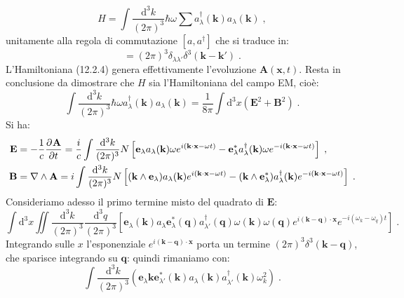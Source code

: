 \documentclass[12pt,a4paper]{report}
\theoremstyle{definition}
\newcommand{\pdev}[3][]{\frac{\partial^{#1} #2}{\partial #3^{#1}}}
\numberwithin{equation}{section}
\newcommand{\diff}[1][]{\mathrm{d}#1}
\newcommand{\adj}[1]{#1^{\dagger}}
\begin{document}
\begin{equation}
H=\int \frac{\diff^3{k}}{(2\pi)^3}\hbar\omega\sum \adj{a_{\lambda}}(\mathbf{k})a_{\lambda}(\mathbf{k})\;,
\end{equation}
unitamente alla regola di commutazione $[a,\adj{a}]$ che si traduce in:
\begin{equation}
[a_{\lambda}(\mathbf{k}),\adj{a}_{\lambda'}(\mathbf{k}')]=(2\pi)^3\delta_{\lambda\lambda'}\delta^3(\mathbf{k}-\mathbf{k}')\;.
\end{equation}
L'Hamiltoniana (12.2.4) genera effettivamente l'evoluzione $\mathbf{A}(\mathbf{x},t)$. Resta in conclusione da dimostrare che $H$ sia l'Hamiltoniana del campo EM, cioè:
\begin{equation}
\int \frac{\diff^3{k}}{(2\pi)^3}\hbar\omega\adj{a_{\lambda}}(\mathbf{k})a_{\lambda}(\mathbf{k})=\frac{1}{8\pi}\int\diff^3{x}(\mathbf{E}^2+\mathbf{B}^2)\;.
\end{equation}
Si ha:
\begin{align}
\mathbf{E} &= -\frac{1}{c}\pdev{\mathbf{A}}{t} = \frac{i}{c}\int\frac{\diff^3{k}}{(2\pi)^3}N\left[
\mathbf{e}_{\lambda}a_{\lambda}(\mathbf{k})\omega e^{i(\mathbf{k}\cdot\mathbf{x}-\omega t)}-
\mathbf{e}_{\lambda}^* \adj{a_{\lambda}}(\mathbf{k})\omega e^{-i(\mathbf{k}\cdot\mathbf{x}-\omega t)}\right] \notag\;, \\
\mathbf{B} &= \nabla\wedge\mathbf{A}=i\int\frac{\diff^3{k}}{(2\pi)^3}N\left[(\mathbf{k}\wedge\mathbf{e}_{\lambda})a_{\lambda}(\mathbf{k})e^{i(\mathbf{k}\cdot\mathbf{x}-\omega t)}-
(\mathbf{k}\wedge\mathbf{e}_{\lambda}^*)\adj{a_{\lambda}}(\mathbf{k})e^{-i(\mathbf{k}\cdot\mathbf{x}-\omega t)}\right]\;.
\end{align}
Consideriamo adesso il primo termine misto del quadrato di $\mathbf{E}$:
\begin{equation}
\int\diff^3{x}\iint \frac{\diff^3{k}}{(2\pi)^3}\frac{\diff^3{q}}{(2\pi)^3}\left[
\mathbf{e}_{\lambda}(\mathbf{k})a_{\lambda}\mathbf{e}_{\lambda}^*(\mathbf{q})\adj{a_{\lambda'}}(\mathbf{q})\omega(\mathbf{k})\omega(\mathbf{q})e^{i(\mathbf{k}-\mathbf{q})\cdot\mathbf{x}}e^{-i(\omega_k-\omega_q)t}\right]\;.
\end{equation}
Integrando sulle $x$ l'esponenziale $e^{i(\mathbf{k}-\mathbf{q})\cdot\mathbf{x}}$ porta un termine $(2\pi)^3\delta^3(\mathbf{k}-\mathbf{q})$, che sparisce integrando su $\mathbf{q}$: quindi rimaniamo con:
\begin{equation}
\int\frac{\diff^3{k}}{(2\pi)^3}\left(\mathbf{e}_{\lambda}\mathbf{k}\mathbf{e}_{\lambda'}^*(\mathbf{k})a_{\lambda}(\mathbf{k})\adj{a_{\lambda'}}(\mathbf{k})\omega_k^2\right)\;.
\end{equation}
\end{document}

